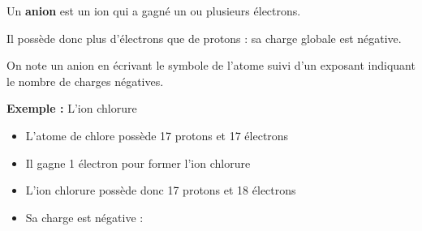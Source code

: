 \documentclass[11pt,a4paper]{article}
\begin{document}
\begin{tcolorbox}[colback=red!5!white,colframe=red!75!black]
{
Un \textbf{anion} est un ion qui a gagné un ou plusieurs électrons.

Il possède donc plus d'électrons que de protons : sa charge globale est négative.

On note un anion en écrivant le symbole de l'atome suivi d'un exposant indiquant le nombre de charges négatives.

}
\end{tcolorbox}



\begin{tcolorbox}[colback=red!5!white,colframe=red!75!black]
{
\textbf{Exemple : } L'ion chlorure 

\begin{itemize}
    \item L'atome de chlore possède 17 protons et 17 électrons
    \item Il gagne 1 électron pour former l'ion chlorure
    \item L'ion chlorure possède donc 17 protons et 18 électrons
    \item Sa charge est négative : 
\end{itemize}
}
\end{tcolorbox}
\end{document}
